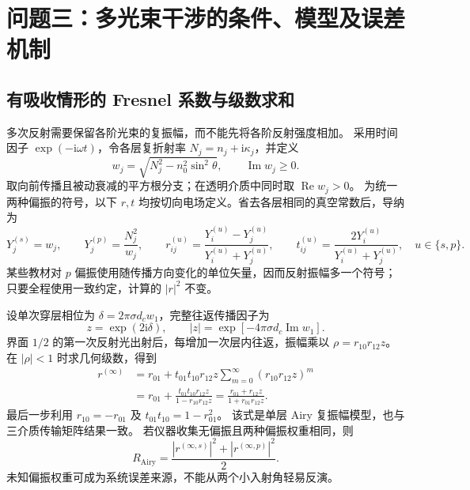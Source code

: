 \section{问题三：多光束干涉的条件、模型及误差机制}
\label{sec:multi-theory}

\subsection{有吸收情形的 Fresnel 系数与级数求和}
多次反射需要保留各阶光束的复振幅，而不能先将各阶反射强度相加。
采用时间因子 $\exp(-\mathrm{i}\omega t)$，令各层复折射率
$N_j=n_j+\mathrm{i}\kappa_j$，并定义
\begin{equation}
 w_j=\sqrt{N_j^2-n_0^2\sin^2\theta},\qquad
 \operatorname{Im}w_j\geq0.
 \label{eq:complex-normal-index}
\end{equation}
取向前传播且被动衰减的平方根分支；在透明介质中同时取 $\operatorname{Re}w_j>0$。
为统一两种偏振的符号，以下 $r,t$ 均按切向电场定义。省去各层相同的真空常数后，导纳为
\begin{equation}
 Y_j^{(s)}=w_j,\qquad Y_j^{(p)}=\frac{N_j^2}{w_j},\qquad
 r_{ij}^{(u)}=\frac{Y_i^{(u)}-Y_j^{(u)}}{Y_i^{(u)}+Y_j^{(u)}},\qquad
 t_{ij}^{(u)}=\frac{2Y_i^{(u)}}{Y_i^{(u)}+Y_j^{(u)}},\quad u\in\{s,p\}.
 \label{eq:admittance-fresnel}
\end{equation}
某些教材对 $p$ 偏振使用随传播方向变化的单位矢量，因而反射振幅多一个符号；
只要全程使用一致约定，计算的 $|r|^2$ 不变\cite{Byrnes2016}。

设单次穿层相位为 $\delta=2\pi\sigma d_cw_1$，完整往返传播因子为
\begin{equation}
 z=\exp(2\mathrm{i}\delta),\qquad
 |z|=\exp[-4\pi\sigma d_c\operatorname{Im}w_1].
 \label{eq:roundtrip-propagation}
\end{equation}
界面 $1/2$ 的第一次反射光出射后，每增加一次层内往返，振幅乘以
$\rho=r_{10}r_{12}z$。在 $|\rho|<1$ 时求几何级数，得到
\begin{align}
 r^{(\infty)}
 &=r_{01}+t_{01}t_{10}r_{12}z
 \sum_{m=0}^{\infty}(r_{10}r_{12}z)^m\\
 &=r_{01}+\frac{t_{01}t_{10}r_{12}z}{1-r_{10}r_{12}z}
 =\frac{r_{01}+r_{12}z}{1+r_{01}r_{12}z}.
 \label{eq:airy-complex}
\end{align}
最后一步利用 $r_{10}=-r_{01}$ 及 $t_{01}t_{10}=1-r_{01}^2$。
该式是单层 Airy 复振幅模型，也与三介质传输矩阵结果一致。
若仪器收集无偏振且两种偏振权重相同，则
\begin{equation}
 R_{\mathrm{Airy}}=\frac{|r^{(\infty,s)}|^2+|r^{(\infty,p)}|^2}{2}.
 \label{eq:unpolarized-airy}
\end{equation}
未知偏振权重可成为系统误差来源，不能从两个小入射角轻易反演。

